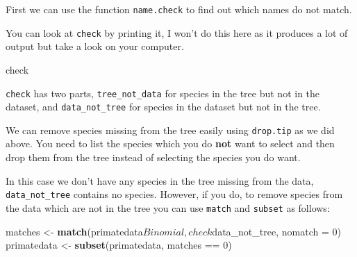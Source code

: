 \documentclass[]{book}
\newenvironment{Shaded}{\begin{snugshade}}{\end{snugshade}}
\newcommand{\KeywordTok}[1]{\textcolor[rgb]{0.13,0.29,0.53}{\textbf{{#1}}}}
\newcommand{\DataTypeTok}[1]{\textcolor[rgb]{0.13,0.29,0.53}{{#1}}}
\newcommand{\DecValTok}[1]{\textcolor[rgb]{0.00,0.00,0.81}{{#1}}}
\newcommand{\StringTok}[1]{\textcolor[rgb]{0.31,0.60,0.02}{{#1}}}
\newcommand{\NormalTok}[1]{{#1}}
\begin{document}
First we can use the function \texttt{name.check} to find out which
names do not match.

\begin{Shaded}
\end{Shaded}

You can look at \texttt{check} by printing it, I won't do this here as
it produces a lot of output but take a look on your computer.

\begin{Shaded}
\begin{Highlighting}[]
\NormalTok{check}
\end{Highlighting}
\end{Shaded}

\texttt{check} has two parts, \texttt{tree\_not\_data} for species in
the tree but not in the dataset, and \texttt{data\_not\_tree} for
species in the dataset but not in the tree.

We can remove species missing from the tree easily using
\texttt{drop.tip} as we did above. You need to list the species which
you do \textbf{not} want to select and then drop them from the tree
instead of selecting the species you do want.

\begin{Shaded}
\end{Shaded}

In this case we don't have any species in the tree missing from the
data, \texttt{data\_not\_tree} contains no species. However, if you do,
to remove species from the data which are not in the tree you can use
\texttt{match} and \texttt{subset} as follows:

\begin{Shaded}
\begin{Highlighting}[]
\NormalTok{matches <-}\StringTok{ }\KeywordTok{match}\NormalTok{(primatedata$Binomial, check$data_not_tree, }\DataTypeTok{nomatch =} \DecValTok{0}\NormalTok{)}
\NormalTok{primatedata <-}\StringTok{ }\KeywordTok{subset}\NormalTok{(primatedata, matches ==}\StringTok{ }\DecValTok{0}\NormalTok{)}
\end{Highlighting}
\end{Shaded}
\end{document}
